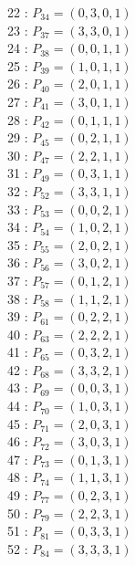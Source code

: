 \documentclass{article}
\begin{document}
{\begin{multicols}{3}
22 : $P_{34}=( 0, 3, 0, 1 )$\\
23 : $P_{37}=( 3, 3, 0, 1 )$\\
24 : $P_{38}=( 0, 0, 1, 1 )$\\
25 : $P_{39}=( 1, 0, 1, 1 )$\\
26 : $P_{40}=( 2, 0, 1, 1 )$\\
27 : $P_{41}=( 3, 0, 1, 1 )$\\
28 : $P_{42}=( 0, 1, 1, 1 )$\\
29 : $P_{45}=( 0, 2, 1, 1 )$\\
30 : $P_{47}=( 2, 2, 1, 1 )$\\
31 : $P_{49}=( 0, 3, 1, 1 )$\\
32 : $P_{52}=( 3, 3, 1, 1 )$\\
33 : $P_{53}=( 0, 0, 2, 1 )$\\
34 : $P_{54}=( 1, 0, 2, 1 )$\\
35 : $P_{55}=( 2, 0, 2, 1 )$\\
36 : $P_{56}=( 3, 0, 2, 1 )$\\
37 : $P_{57}=( 0, 1, 2, 1 )$\\
38 : $P_{58}=( 1, 1, 2, 1 )$\\
39 : $P_{61}=( 0, 2, 2, 1 )$\\
40 : $P_{63}=( 2, 2, 2, 1 )$\\
41 : $P_{65}=( 0, 3, 2, 1 )$\\
42 : $P_{68}=( 3, 3, 2, 1 )$\\
43 : $P_{69}=( 0, 0, 3, 1 )$\\
44 : $P_{70}=( 1, 0, 3, 1 )$\\
45 : $P_{71}=( 2, 0, 3, 1 )$\\
46 : $P_{72}=( 3, 0, 3, 1 )$\\
47 : $P_{73}=( 0, 1, 3, 1 )$\\
48 : $P_{74}=( 1, 1, 3, 1 )$\\
49 : $P_{77}=( 0, 2, 3, 1 )$\\
50 : $P_{79}=( 2, 2, 3, 1 )$\\
51 : $P_{81}=( 0, 3, 3, 1 )$\\
52 : $P_{84}=( 3, 3, 3, 1 )$\\
\end{multicols}


%


%


}%
\end{document}
